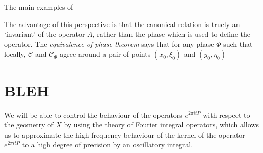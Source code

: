 The main examples of 

The advantage of this perspective is that the canonical relation is truely an `invariant' of the operator $A$, rather than the phase which is used to define the operator. The \emph{equivalence of phase theorem} says that for any phase $\Phi$ such that locally, $\mathcal{C}$ and $\mathcal{C}_\Phi$ agree around a pair of points $(x_0,\xi_0)$ and $(y_0,\eta_0)$


%
%


\section{BLEH}

We will be able to control the behaviour of the operators $e^{2 \pi i t P}$ with respect to the geometry of $X$ by using the theory of Fourier integral operators, which allows us to approximate the high-frequency behaviour of the kernel of the operator $e^{2 \pi i t P}$ to a high degree of precision by an oscillatory integral.

